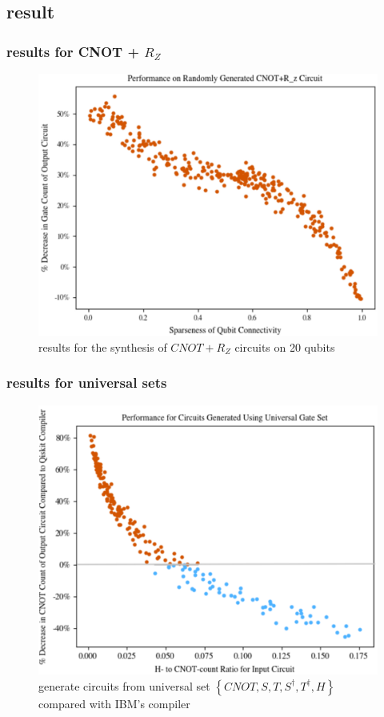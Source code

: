 \subsection{result}
\begin{frame}
    \frametitle{results for CNOT + $R_Z$}
    \begin{figure}
        \includegraphics[width=.6\linewidth]{figure/CNOT+Rz.png}
        \caption{results for the synthesis of $CNOT + R_Z$ circuits on 20 qubits}
    \end{figure}
\end{frame}
\begin{frame}
    \frametitle{results for universal sets}
    \begin{figure}
        \includegraphics[width=.6\linewidth]{figure/universal.png}
        \caption{generate circuits from universal set $\left\{CNOT,S,T,S^{\dagger},T^{\dagger},H\right\}$ compared with IBM's compiler}
    \end{figure}
\end{frame}